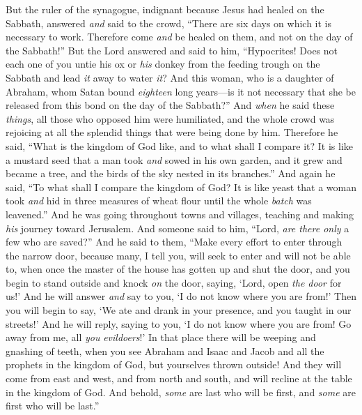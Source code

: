 \begin{biblechapter}
\verse But the ruler of the synagogue, indignant because Jesus had healed on the Sabbath, answered \textit{and} said to the crowd, “There are six days on which it is necessary to work. Therefore come \textit{and} be healed on them, and not on the day of the Sabbath!”
\verse But the Lord answered and said to him, “Hypocrites! Does not each one of you untie his ox or \textit{his} donkey from the feeding trough on the Sabbath and lead \textit{it} away to water \textit{it}?
\verse And this woman, who is a daughter of Abraham, whom Satan bound \textit{eighteen} long years—is it not necessary that she be released from this bond on the day of the Sabbath?”
\verse And \textit{when} he said these \textit{things}, all those who opposed him were humiliated, and the whole crowd was rejoicing at all the splendid things that were being done by him.
 Therefore he said, “What is the kingdom of God like, and to what shall I compare it?
\verse It is like a mustard seed that a man took \textit{and} sowed in his own garden, and it grew and became a tree, and the birds of the sky nested in its branches.”
 And again he said, “To what shall I compare the kingdom of God?
\verse It is like yeast that a woman took \textit{and} hid in three measures of wheat flour until the whole \textit{batch} was leavened.”
 And he was going throughout towns and villages, teaching and making \textit{his} journey toward Jerusalem.
\verse And someone said to him, “Lord, \textit{are there only} a few who are saved?” And he said to them,
\verse “Make every effort to enter through the narrow door, because many, I tell you, will seek to enter and will not be able to,
\verse when once the master of the house has gotten up and shut the door, and you begin to stand outside and knock \textit{on} the door, saying, ‘Lord, open \textit{the door} for us!’ And he will answer \textit{and} say to you, ‘I do not know where you are from!’
\verse Then you will begin to say, ‘We ate and drank in your presence, and you taught in our streets!’
\verse And he will reply, saying to you, ‘I do not know where you are from! Go away from me, all \textit{you} \textit{evildoers}!’
\verse In that place there will be weeping and gnashing of teeth, when you see Abraham and Isaac and Jacob and all the prophets in the kingdom of God, but yourselves thrown outside!
\verse And they will come from east and west, and from north and south, and will recline at the table in the kingdom of God.
\verse And behold, \textit{some} are last who will be first, and \textit{some} are first who will be last.”

\end{biblechapter}
